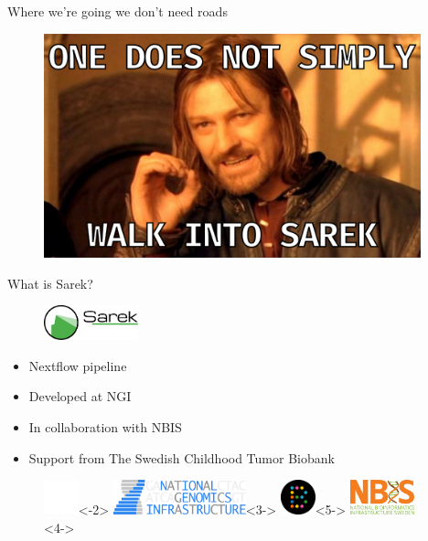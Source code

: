 \documentclass[usepdftitle=false]{beamer}
\begin{document}
\begin{frame}{Where we're going we don't need roads}
	\begin{figure}
		\includegraphics[height=6.5cm]{pictures/OneDoesNotSimply-meme.png}
	\end{figure}
\end{frame}


\begin{frame}{What is Sarek?}
	\begin{figure}
		\includegraphics[height=1cm]{pictures/Sarek_no_border}
	\end{figure}
	\begin{itemize}
		\pause
		\item Nextflow pipeline
		\item<3-> Developed at NGI
		\item<4-> In collaboration with NBIS
		\item<5-> Support from The Swedish Childhood Tumor Biobank
	\end{itemize}
	\begin{figure}
		\includegraphics[height=1cm]{pictures/blank}<-2>
		\includegraphics[height=1cm]{pictures/NGI}<3->
		\only<3->{\hfill}
		\includegraphics[height=1cm]{pictures/Barntumorbanken}<5->
		\only<4->{\hfill}
		\includegraphics[height=1cm]{pictures/NBIS}<4->
	\end{figure}
	\vfill
\end{frame}
\end{document}
